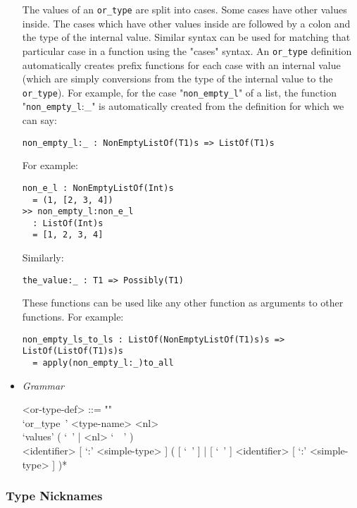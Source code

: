\documentclass{article}
\begin{document}
\begin{itemize}
The values of an \texttt{or_type} are split into cases. Some cases have other
values inside.  The cases which have other values inside are followed by a
colon and the type of the internal value. Similar syntax can be used for
matching that particular case in a function using the "cases" syntax.  An
\texttt{or_type} definition automatically creates prefix functions for each
case with an internal value (which are simply conversions from the type of the
internal value to the \texttt{or_type}).  For example, for the case
"\texttt{non_empty_l}" of a list, the function "\texttt{non_empty_l}:_" is
automatically created from the definition for which we can say:
\begin{verbatim}
non_empty_l:_ : NonEmptyListOf(T1)s => ListOf(T1)s
\end{verbatim}
For example:
\begin{verbatim}
non_e_l : NonEmptyListOf(Int)s
  = (1, [2, 3, 4])
>> non_empty_l:non_e_l
  : ListOf(Int)s
  = [1, 2, 3, 4]
\end{verbatim}
Similarly:
\begin{verbatim}
the_value:_ : T1 => Possibly(T1)
\end{verbatim}
These functions can be used like any other function as arguments to other
functions.  For example:
\begin{verbatim}
non_empty_ls_to_ls : ListOf(NonEmptyListOf(T1)s)s => ListOf(ListOf(T1)s)s
  = apply(non_empty_l:_)to_all
\end{verbatim}

\item \textit{Grammar}

\begin{grammar}
<or-type-def> ::= ""\\
`or_type\ ' <type-name> <nl> \\
`values' ( `\ ' | <nl> `\ \ ' ) \\ 
<identifier> [ `:' <simple-type> ]
( [ `\ ' ] | [ `\ ' ] <identifier> [ `:' <simple-type> ] )*
\end{grammar}

\end{itemize}

\subsubsection{Type Nicknames}
\end{document}
